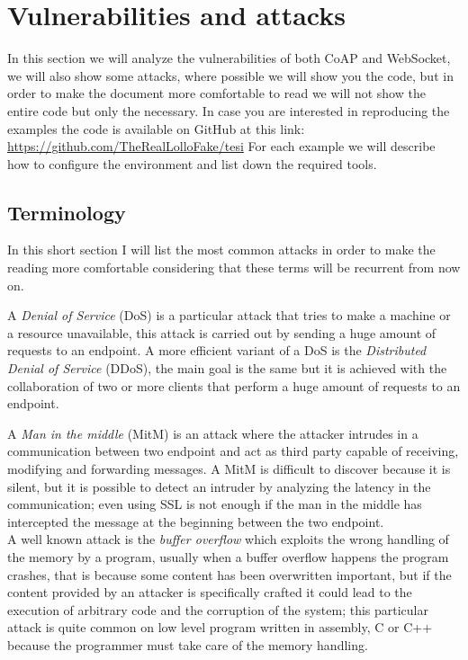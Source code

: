	\chapter{Vulnerabilities and attacks}\label{ch:vuln}
	In this section we will analyze the vulnerabilities of both CoAP and WebSocket, we will also show some attacks,
	where possible we will show you the code, but in order to make the document more comfortable to read we will not
	show the entire code but only the necessary.\newline
	In case you are interested in reproducing the examples the code is available on GitHub at this link:\\ \url{https://github.com/TheRealLolloFake/tesi}
	For each example we will describe how to configure the environment
	and list down the required tools.\newline
	
	\section{Terminology}
	In this short section I will list the most common attacks in order to make the reading more comfortable considering that these terms will be recurrent from now on.\newline
	
	A \emph{Denial of Service} (DoS) is a particular attack that tries to make a machine or a resource unavailable, this
	attack is carried out by sending a huge amount of requests to an endpoint.\newline
	A more efficient variant of a DoS is the \emph{Distributed Denial of Service} (DDoS), the main goal is the same but it is achieved
	with the collaboration of two or more clients that perform a huge amount of requests to an endpoint.\newline
	
	A \emph{Man in the middle} (MitM) is an attack where the attacker intrudes in a communication between two endpoint
	and act as third party capable of receiving, modifying and forwarding messages.\newline
	A MitM is difficult to discover because it is silent, but it is possible to detect an intruder by analyzing
	the latency in the communication; even using SSL is not enough if the man in the middle has intercepted
	the message at the beginning between the two endpoint.\\
	
	
	A well known attack is the \emph{buffer overflow} which exploits the wrong handling of the memory by a program, usually when a buffer
	overflow happens the program crashes, that is because some content has been overwritten important,
	but if the content provided by an attacker is specifically crafted it could lead to the execution of arbitrary code
	and the corruption of the system; this particular attack is quite common on low level program written in assembly, C or C++
	because the programmer must take care of the memory handling.\newline
	
